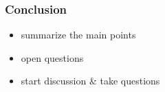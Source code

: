 \begin{frame}
	\frametitle{Conclusion}

	\begin{itemize}
		\item summarize the main points
		\item open questions
		\item start discussion \& take questions
	\end{itemize}
\end{frame}